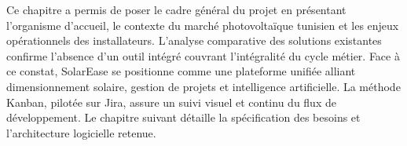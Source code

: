 Ce chapitre a permis de poser le cadre général du projet en présentant
l'organisme d'accueil, le contexte du marché photovoltaïque tunisien et les
enjeux opérationnels des installateurs. L'analyse comparative des solutions
existantes confirme l'absence d'un outil intégré couvrant l'intégralité du
cycle métier. Face à ce constat, SolarEase se positionne comme une plateforme
unifiée alliant dimensionnement solaire, gestion de projets et intelligence
artificielle. La méthode Kanban, pilotée sur Jira, assure un suivi visuel et
continu du flux de développement. Le chapitre suivant détaille la spécification
des besoins et l'architecture logicielle retenue.

\cleardoublepage
